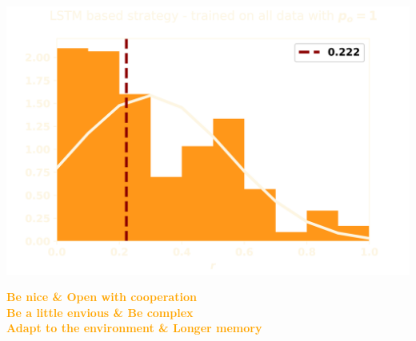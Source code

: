 \documentclass{beamer}
\begin{document}
\begin{frame}
    \begin{center}
    
    \end{center}
\end{frame}
\begin{frame}
    \begin{center}
    \includegraphics[width=.75\textwidth]{static/lstm_result.png}
    \end{center}
\end{frame}


\begin{frame}
    \begin{center}
    \large{\textbf{\textcolor{orange}{Be nice \& Open with cooperation}}} \vspace{1cm} \\ \pause
    \large{\textbf{\textcolor{orange}{Be a little envious \& Be complex}}} \vspace{1cm} \\ \pause
    \large{\textbf{\textcolor{orange}{Adapt to the environment \& Longer memory}}}
    \end{center}
\end{frame}
\end{document}

